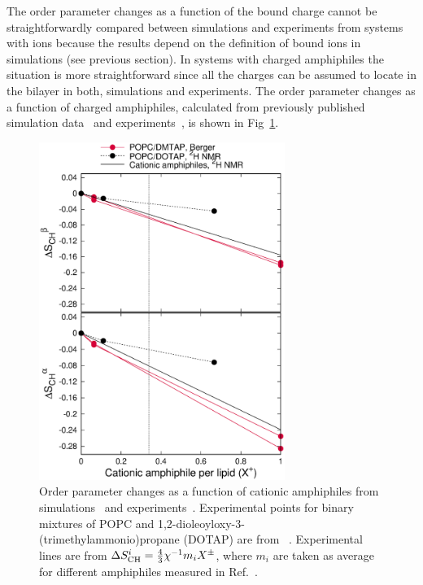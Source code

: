 \documentclass[twoside,twocolumn,9pt]{article}
\begin{document}
The order parameter changes as a function of the bound charge cannot be straightforwardly
compared between simulations and experiments from systems with ions because the 
results depend on the definition of bound ions in simulations (see previous section). In systems with charged
amphiphiles the situation is more straightforward since all the charges can be assumed 
to locate in the bilayer in both, simulations and experiments. The order parameter changes as a 
function of charged amphiphiles, calculated from previously published simulation 
data~\cite{miettinen09,DMPC_DMTAP0mol,DMPC_DMTAP6mol,DMPC_DMTAP50mol} and
experiments~\cite{scherer89,franzin98}, is shown in Fig~\ref{DMPC_DMTAP}.
\begin{figure}[t]
  \centering
  \includegraphics[width=8cm]{../Fig/OrderParameterDMPC_DMTAP.eps} 
  \caption{\label{DMPC_DMTAP}
    Order parameter changes as a function of cationic amphiphiles from simulations~\cite{miettinen09,DMPC_DMTAP0mol,DMPC_DMTAP6mol,DMPC_DMTAP50mol} 
    and experiments~\cite{scherer89,franzin98}. Experimental points for binary mixtures of POPC and 1,2-dioleoyloxy-3-(trimethylammonio)propane (DOTAP)
    are from ~\cite{franzin98}. Experimental lines are from $\Delta S_{\rm{CH}}^{i}=\frac{4}{3}\chi^{-1}m_i X^\pm$, where $m_i$ are taken as average
    for different amphiphiles measured in Ref.~.
}
\end{figure}
\end{document}
